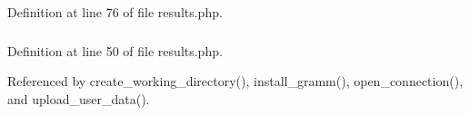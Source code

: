 Definition at line 76 of file results.php.
\subsubsection{}\label{results_8php_a1}




Definition at line 50 of file results.php.

Referenced by create\_\-working\_\-directory(), install\_\-gramm(), open\_\-connection(), and upload\_\-user\_\-data().
